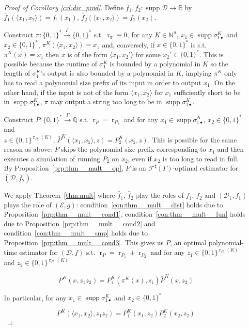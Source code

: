 \documentclass[11pt]{article}
\numberwithin{equation}{section}
\theoremstyle{definition}
\theoremstyle{plain}
\newcommand{\Bool}{\{0,1\}}
\newcommand{\Words}{{\Bool^*}}
\DeclareMathOperator{\Supp}{supp}
\DeclareMathOperator{\R}{r}
\newcommand{\Nats}{\mathbb{N}}
\newcommand{\Rats}{\mathbb{Q}}
\newcommand{\Reals}{\mathbb{R}}
\newcommand{\Chev}[1]{\langle #1 \rangle}
\newcommand{\Dist}{\mathcal{D}}
\newcommand{\Fall}{\mathcal{F}}
\newcommand{\ESG}{\Fall^\sharp(\Gamma)}
\newcommand{\Scheme}{\xrightarrow{\Gamma}}
\begin{document}
\begin{proof}[Proof of Corollary \ref{crl:dir_prod}]

Define $\bar{f}_1, \bar{f}_2: \Supp \Dist \rightarrow \Reals$ by $\bar{f}_1(\Chev{x_1,x_2})=f_1(x_1)$, $\bar{f}_2(\Chev{x_1,x_2})=f_2(x_2)$. 

Construct $\pi: \Words \Scheme \Words$ s.t. $\R_\pi \equiv 0$, for any $K \in \Nats^n$, ${x_1 \in \Supp \sigma_{1\bullet}^{K}}$ and ${x_2 \in \Words}$, ${\pi^{K}(\Chev{x_1,x_2})=x_1}$ and, conversely, if ${x \in \Words}$ is s.t. ${\pi^K(x)=x_1}$ then ${x}$ is of the form ${\Chev{x_1,x_2'}}$ for some ${x_2' \in \Words}$. This is possible because the runtime of $\sigma_1^K$ is bounded by a polynomial in $K$ so the length of $\sigma_{1}^K$'s output is also bounded by a polynomial in $K$, implying $\pi^K$ only has to read a polynomial size prefix of its input in order to output $x_1$. On the other hand, if the input is not of the form ${\Chev{x_1,x_2}}$ for ${x_1}$ sufficiently short to be in ${\Supp \sigma_{1\bullet}^{K}}$, ${\pi}$ may output a string too long to be in ${\Supp \sigma_{1\bullet}^{K}}$.

Construct $\bar{P}: \Words \Scheme \Rats$ s.t. $\R_{\bar{P}}=\R_{P_2}$ and for any $x_1 \in \Supp \sigma_{1\bullet}^K$, $x_2 \in \Words$ and\\ $z \in \Bool^{\R_{P_2}(K)}$, $\bar{P}^K(\Chev{x_1,x_2},z)=P_2^K(x_2,z)$. This is possible for the same reason as above: $\bar{P}$ skips the polynomial size prefix corresponding to $x_1$ and then executes a simulation of running $P_2$ on $x_2$, even if $x_2$ is too long to read in full. By Proposition~\ref{prp:thm__mult__op}, $\bar{P}$ is an $\ESG$-optimal estimator for $(\Dist,\bar{f}_2)$. 

We apply Theorem~\ref{thm:mult} where $\bar{f}_1$, $\bar{f}_2$ play the roles of $f_1$, $f_2$ and $(\Dist_1, f_1)$ plays the role of $(\mathcal{E},g)$: condition~\ref{con:thm__mult__dist} holds due to Proposition~\ref{prp:thm__mult__cond1}, condition~\ref{con:thm__mult__fun} holds due to Proposition~\ref{prp:thm__mult__cond2} and condition~\ref{con:thm__mult__smp} holds due to Proposition~\ref{prp:thm__mult__cond3}. This gives us $P$, an optimal polynomial-time estimator for $(\Dist, f)$ s.t. ${\R_P=\R_{P_1}+\R_{P_2}}$ and for any ${z_1 \in \Bool^{\R_{P_1}(K)}}$ and $z_2 \in \Bool^{\R_{P_1}(K)}$ 

\[P^K(x, z_1 z_2) = P_1^K(\pi^K(x),z_1) \bar{P}^K(x,z_2)\]

In particular, for any ${x_1 \in \Supp \sigma_{1\bullet}^K}$ and $x_2 \in \Words$

\[P^K(\Chev{x_1,x_2}, z_1 z_2)=P_1^K(x_1,z_2)P_2^K(x_2,z_2)\]
%
\end{proof}
\end{document}
